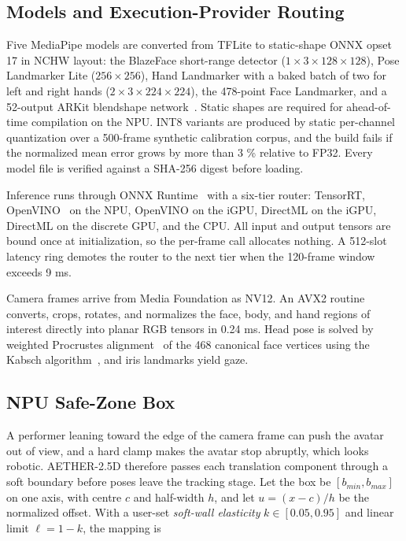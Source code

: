 \documentclass[conference]{IEEEtran}
\begin{document}
\subsection{Models and Execution-Provider Routing}
Five MediaPipe models are converted from TFLite to static-shape ONNX opset 17 in NCHW layout: the BlazeFace short-range detector ($1\times3\times128\times128$), Pose Landmarker Lite ($256\times256$), Hand Landmarker with a baked batch of two for left and right hands ($2\times3\times224\times224$), the 478-point Face Landmarker, and a 52-output ARKit blendshape network~\cite{arkit}. Static shapes are required for ahead-of-time compilation on the NPU. INT8 variants are produced by static per-channel quantization over a 500-frame synthetic calibration corpus, and the build fails if the normalized mean error grows by more than 3 \% relative to FP32. Every model file is verified against a SHA-256 digest before loading.

Inference runs through ONNX Runtime~\cite{ort} with a six-tier router: TensorRT, OpenVINO~\cite{openvino} on the NPU, OpenVINO on the iGPU, DirectML on the iGPU, DirectML on the discrete GPU, and the CPU. All input and output tensors are bound once at initialization, so the per-frame call allocates nothing. A 512-slot latency ring demotes the router to the next tier when the 120-frame window exceeds 9 ms.

Camera frames arrive from Media Foundation as NV12. An AVX2 routine converts, crops, rotates, and normalizes the face, body, and hand regions of interest directly into planar RGB tensors in 0.24 ms. Head pose is solved by weighted Procrustes alignment~\cite{gower} of the 468 canonical face vertices using the Kabsch algorithm~\cite{kabsch}, and iris landmarks yield gaze.


\subsection{NPU Safe-Zone Box}
A performer leaning toward the edge of the camera frame can push the avatar out of view, and a hard clamp makes the avatar stop abruptly, which looks robotic. AETHER-2.5D therefore passes each translation component through a soft boundary before poses leave the tracking stage. Let the box be $[b_{min}, b_{max}]$ on one axis, with centre $c$ and half-width $h$, and let $u = (x - c)/h$ be the normalized offset. With a user-set \textit{soft-wall elasticity} $k \in [0.05, 0.95]$ and linear limit $\ell = 1 - k$, the mapping is
\end{document}
